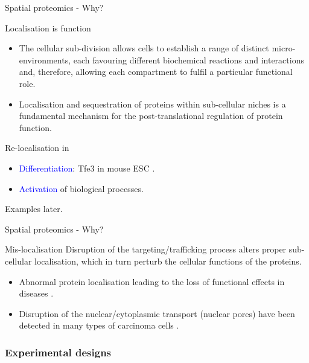 \begin{frame}{Spatial proteomics - Why?}
  \begin{block}{Localisation is function} 
    \begin{itemize}
    \item The cellular sub-division allows cells to establish a range
      of distinct micro-environments, each favouring different
      biochemical reactions and interactions and, therefore, allowing
      each compartment to fulfil a particular functional role.          
    \item Localisation and sequestration of proteins within
      sub-cellular niches is a fundamental mechanism for the
      post-translational regulation of protein function.         
    \end{itemize}
  \end{block}
  \begin{block}{Re-localisation in} 
    \begin{itemize}
    \item \textcolor{Blue}{Differentiation}: Tfe3 in mouse ESC
      \citep{Betschinger:2013}.
    \item \textcolor{Blue}{Activation} of biological processes.
    \end{itemize}
    Examples later.
  \end{block}  
\end{frame}

\begin{frame}{Spatial proteomics - Why?}
  \begin{block}{Mis-localisation}   
    Disruption of the targeting/trafficking process alters proper
    sub-cellular localisation, which in turn perturb the cellular
    functions of the proteins.  
    \begin{itemize}
    \item Abnormal protein localisation leading to the loss of functional
      effects in diseases \citep{Laurila2009}.    
    \item Disruption of the nuclear/cytoplasmic transport (nuclear
      pores) have been detected in many types of carcinoma cells
      \citep{Kau2004}.
    \end{itemize}      
  \end{block}

\end{frame}


\subsubsection*{Experimental designs}
\label{sec:expdesign}

